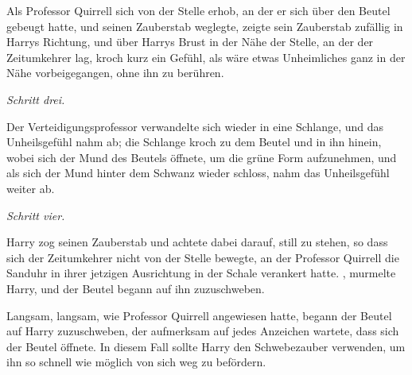 Als Professor Quirrell sich von der Stelle erhob, an der er sich über den Beutel gebeugt hatte, und seinen Zauberstab weglegte, zeigte sein Zauberstab zufällig in Harrys Richtung, und über Harrys Brust in der Nähe der Stelle, an der der Zeitumkehrer lag, kroch kurz ein Gefühl, als wäre etwas Unheimliches ganz in der Nähe vorbeigegangen, ohne ihn zu berühren.

\emph{Schritt drei.}

Der Verteidigungsprofessor verwandelte sich wieder in eine Schlange, und das Unheilsgefühl nahm ab; die Schlange kroch zu dem Beutel und in ihn hinein, wobei sich der Mund des Beutels öffnete, um die grüne Form aufzunehmen, und als sich der Mund hinter dem Schwanz wieder schloss, nahm das Unheilsgefühl weiter ab.

\emph{Schritt vier.}

Harry zog seinen Zauberstab und achtete dabei darauf, still zu stehen, so dass sich der Zeitumkehrer nicht von der Stelle bewegte, an der Professor Quirrell die Sanduhr in ihrer jetzigen Ausrichtung in der Schale verankert hatte. , murmelte Harry, und der Beutel begann auf ihn zuzuschweben.

Langsam, langsam, wie Professor Quirrell angewiesen hatte, begann der Beutel auf Harry zuzuschweben, der aufmerksam auf jedes Anzeichen wartete, dass sich der Beutel öffnete. In diesem Fall sollte Harry den Schwebezauber verwenden, um ihn so schnell wie möglich von sich weg zu befördern.

